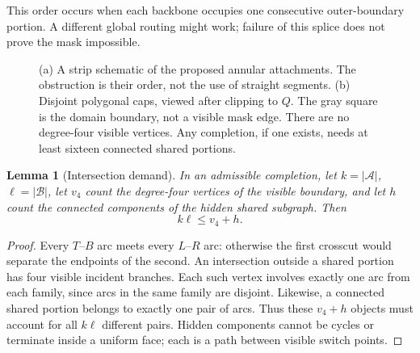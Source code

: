 \documentclass[11pt,a4paper]{article}
\newtheorem{lemma}[theorem]{Lemma}
\theoremstyle{definition}
\begin{document}
This order occurs when each backbone occupies one consecutive outer-boundary
portion. A different global routing might work; failure of this splice does
not prove the mask impossible.

\begin{figure}[htbp]
\centering
{}
\caption{(a) A strip schematic of the proposed annular attachments.
The obstruction is their order, not the use of straight segments.
(b) Disjoint polygonal caps, viewed after clipping to $Q$. The gray square
is the domain boundary, not a visible mask edge. There are no degree-four
visible vertices. Any completion, if one exists, needs at least sixteen
connected shared portions.}
\label{fig:construction}
\end{figure}

\begin{samepage}
\begin{lemma}[Intersection demand]\label{lem:demand}
In an admissible completion, let $k=|\mathcal A|$, $\ell=|\mathcal B|$,
let $v_4$ count the degree-four vertices of the visible boundary, and let
$h$ count the connected components of the hidden shared subgraph. Then
\[
  k\ell\le v_4+h.
\]
\end{lemma}
\begin{proof}
Every $T$--$B$ arc meets every $L$--$R$ arc: otherwise the first crosscut
would separate the endpoints of the second. An intersection outside a shared
portion has four visible incident branches. Each such vertex involves exactly
one arc from each family, since arcs in the same family are disjoint.
Likewise, a connected shared portion belongs to exactly one pair of arcs.
Thus these $v_4+h$ objects must account for all $k\ell$ different pairs.
Hidden components cannot be cycles or terminate inside a uniform face;
each is a path between visible switch points.
\end{proof}
\end{samepage}
\end{document}
